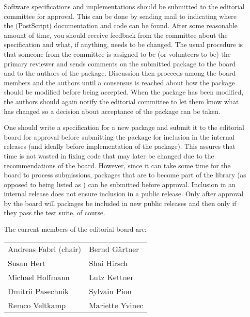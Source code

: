 Software specifications and implementations should be submitted to the 
editorial committee for approval.  This can be done by sending mail to 
 indicating
where the (PostScript) documentation and code can be found.  After
some reasonable amount of time, you should receive feedback from 
the committee about the specification and what, if anything, needs to
be changed. The usual procedure is that someone from the committee is
assigned to be (or volunteers to be) the primary reviewer and sends 
comments on the submitted package to the board and to the authors of
the package.  Discussion then proceeds among the board members and the
authors until a consensus is reached about how the package should be
modified before being accepted.  When the package has been modified,
the authors should again notify the editorial committee to let them
know what has changed so a decision about acceptance of the package
can be taken.  


One should write a specification for a new package
and submit it to the editorial board for 
approval before submitting the package for inclusion in the internal
releases (and ideally before implementation of the package).  This
assures that time is not wasted in fixing code that may later be changed
due to the recommendations of the board.
However, since it can take some time for the board to process
submissions, packages that are to become part of the library 
(as opposed to being listed as 
)
can be submitted 
 before approval.
Inclusion in an internal release does not ensure inclusion in a public
release.  Only after approval by the board will packages be included in new
public releases and then only if they pass the test suite, of course.

The current members of the editorial board are:
\begin{center}
\begin{tabular}{p{5cm}p{5cm}}
Andreas Fabri (chair)  & Bernd G\"artner  \\
Susan Hert             & Shai Hirsch  \\
Michael Hoffmann       & Lutz Kettner  \\
Dmitrii Pasechnik      & Sylvain Pion  \\
Remco Veltkamp         & Mariette Yvinec 
\end{tabular}
\end{center}

